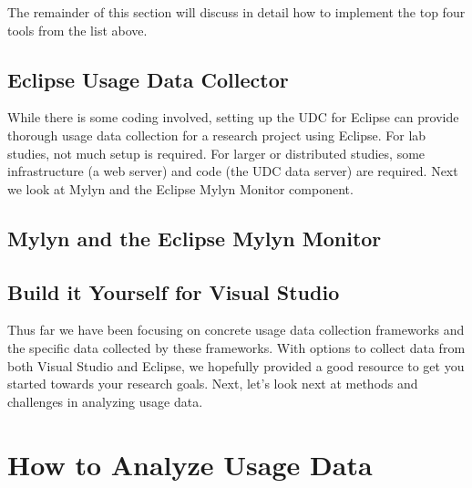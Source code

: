 
The remainder of this section will discuss in detail how to implement the top four tools from the list above.  

\subsection{Eclipse Usage Data Collector}
\label{EclipseUsageDataCollector}


\vspace{0.1in}
While there is some coding involved, setting up the UDC for Eclipse can provide thorough usage data collection for a research project using Eclipse.   For lab studies, not much setup is required.  For larger or distributed studies, some infrastructure (a web server) and code (the UDC data server) are required.  Next we look at Mylyn and the Eclipse Mylyn Monitor component.

\subsection{Mylyn and the Eclipse Mylyn Monitor} 
\label{MylynMonitor}






\subsection{Build it Yourself for Visual Studio} 
\label{buildItYourself}


\vspace{0.1in}
Thus far we have been focusing on concrete usage data collection frameworks and the specific data collected by these frameworks.  With options to collect data from both Visual Studio and Eclipse, we hopefully provided a good resource to get you started towards your research goals.  Next, let's look next at methods and challenges in analyzing usage data.

\section{How to Analyze Usage Data}

